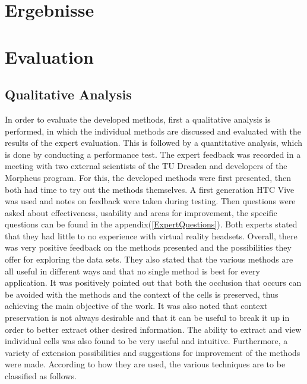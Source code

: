 {\chapter{Ergebnisse}}
{\chapter{Evaluation}}

\label{sec:evaluation}



\section{Qualitative Analysis}
In order to evaluate the developed methods, first a qualitative analysis is performed, in which the individual methods are discussed and evaluated with the results of the expert evaluation. This is followed by a quantitative analysis, which is done by conducting a performance test.
The expert feedback was recorded in a meeting with two external scientists of the TU Dresden and developers of the Morpheus program. For this, the developed methods were first presented, then both had time to try out the methods themselves. A first generation HTC Vive was used and notes on feedback were taken during testing. Then questions were asked about effectiveness, usability and areas for improvement, the specific questions can be found in the appendix(\ref{ExpertQuestions}). Both experts stated that they had little to no experience with virtual reality headsets.
Overall, there was very positive feedback on the methods presented and the possibilities they offer for exploring the data sets.
They also stated that the various methods are all useful in different ways and that no single method is best for every application.
It was positively pointed out that both the occlusion that occurs can be avoided with the methods and the context of the cells is preserved, thus achieving the main objective of the work.
It was also noted that context preservation is not always desirable and that it can be useful to break it up in order to better extract other desired information.
The ability to extract and view individual cells was also found to be very useful and intuitive.
Furthermore, a variety of extension possibilities and suggestions for improvement of the methods were made.
According to how they are used, the various techniques are to be classified as follows.


